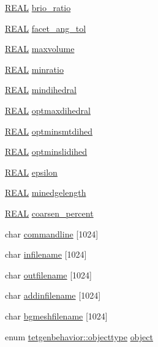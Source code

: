 \begin{DoxyCompactItemize}
\item 
\hyperlink{tetgen_8h_a4b654506f18b8bfd61ad2a29a7e38c25}{R\+E\+AL} \hyperlink{classtetgenbehavior_a3aad13e8567253dd2d2b2e95a4e38ee9}{brio\+\_\+ratio}
\item 
\hyperlink{tetgen_8h_a4b654506f18b8bfd61ad2a29a7e38c25}{R\+E\+AL} \hyperlink{classtetgenbehavior_a200a832d1ad2ff0759bd957c9c226608}{facet\+\_\+ang\+\_\+tol}
\item 
\hyperlink{tetgen_8h_a4b654506f18b8bfd61ad2a29a7e38c25}{R\+E\+AL} \hyperlink{classtetgenbehavior_a8f6cea3179c0be4c104e4a79392952da}{maxvolume}
\item 
\hyperlink{tetgen_8h_a4b654506f18b8bfd61ad2a29a7e38c25}{R\+E\+AL} \hyperlink{classtetgenbehavior_a1c250b5245602594e5c3e0a61d6ba3bd}{minratio}
\item 
\hyperlink{tetgen_8h_a4b654506f18b8bfd61ad2a29a7e38c25}{R\+E\+AL} \hyperlink{classtetgenbehavior_aa48e21ee0ac18d3adadea746e9e39055}{mindihedral}
\item 
\hyperlink{tetgen_8h_a4b654506f18b8bfd61ad2a29a7e38c25}{R\+E\+AL} \hyperlink{classtetgenbehavior_a191cab44548550697e3d672c9966c61b}{optmaxdihedral}
\item 
\hyperlink{tetgen_8h_a4b654506f18b8bfd61ad2a29a7e38c25}{R\+E\+AL} \hyperlink{classtetgenbehavior_a3f4246164c85bd2d1f88ed4e9c739398}{optminsmtdihed}
\item 
\hyperlink{tetgen_8h_a4b654506f18b8bfd61ad2a29a7e38c25}{R\+E\+AL} \hyperlink{classtetgenbehavior_a7298676875d7609798023ec2df17ccb9}{optminslidihed}
\item 
\hyperlink{tetgen_8h_a4b654506f18b8bfd61ad2a29a7e38c25}{R\+E\+AL} \hyperlink{classtetgenbehavior_a65abc49ced365588d5c7bdfce638fab5}{epsilon}
\item 
\hyperlink{tetgen_8h_a4b654506f18b8bfd61ad2a29a7e38c25}{R\+E\+AL} \hyperlink{classtetgenbehavior_a51d41b9aaa89c0dc620c4af78848dfde}{minedgelength}
\item 
\hyperlink{tetgen_8h_a4b654506f18b8bfd61ad2a29a7e38c25}{R\+E\+AL} \hyperlink{classtetgenbehavior_ac9aa3f69cf550eb2ee81fc0cae2fb444}{coarsen\+\_\+percent}
\item 
char \hyperlink{classtetgenbehavior_a56dcfc2ab395c63b7f99d84b2cd1f4e8}{commandline} \mbox{[}1024\mbox{]}
\item 
char \hyperlink{classtetgenbehavior_ac879f6843038d5428199079c515ce6e6}{infilename} \mbox{[}1024\mbox{]}
\item 
char \hyperlink{classtetgenbehavior_aa066e0b8f2b5b3d0f9e5c6b74e8eadc4}{outfilename} \mbox{[}1024\mbox{]}
\item 
char \hyperlink{classtetgenbehavior_a627804470698cc1883fd93999727e334}{addinfilename} \mbox{[}1024\mbox{]}
\item 
char \hyperlink{classtetgenbehavior_ae72a1c6b8d7389d4fad21fa584207aba}{bgmeshfilename} \mbox{[}1024\mbox{]}
\item 
enum \hyperlink{classtetgenbehavior_aeea08e7334fde4251b74a8247bcc54b8}{tetgenbehavior\+::objecttype} \hyperlink{classtetgenbehavior_ae01337ff20025a815a4f2e4d8c3d2871}{object}
\end{DoxyCompactItemize}


